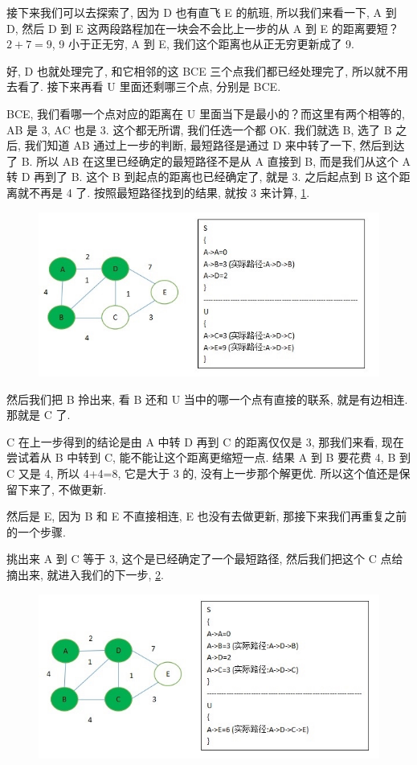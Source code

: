 接下来我们可以去探索了, 因为 D 也有直飞 E 的航班, 所以我们来看一下, A 到 D, 然后 D 到 E 这两段路程加在一块会不会比上一步的从 A 到 E 的距离要短？$2+7=9$, 9 小于正无穷, A 到 E, 我们这个距离也从正无穷更新成了 9.

好, D 也就处理完了, 和它相邻的这 BCE 三个点我们都已经处理完了, 所以就不用去看了. 接下来再看 U 里面还剩哪三个点, 分别是 BCE. 

BCE, 我们看哪一个点对应的距离在 U 里面当下是最小的？而这里有两个相等的, AB 是 3, AC 也是 3. 这个都无所谓, 我们任选一个都 OK. 我们就选 B, 选了 B 之后, 我们知道 AB 通过上一步的判断, 最短路径是通过 D 来中转了一下, 然后到达了 B. 所以 AB 在这里已经确定的最短路径不是从 A 直接到 B, 而是我们从这个 A 转 D 再到了 B. 这个 B 到起点的距离也已经确定了, 就是 3. 之后起点到 B 这个距离就不再是 4 了. 按照最短路径找到的结果, 就按 3 来计算, \ref{fig:img26_5}. 

\begin{figure}[ht]
  \centering
  \includegraphics[width=0.7\linewidth]{asset/20230924051224.jpg}
  \caption{}
  \label{fig:img26_5}
\end{figure}

然后我们把 B 拎出来, 看 B 还和 U 当中的哪一个点有直接的联系, 就是有边相连. 那就是 C 了. 

C 在上一步得到的结论是由 A 中转 D 再到 C 的距离仅仅是 3, 那我们来看, 现在尝试着从 B 中转到 C, 能不能让这个距离更缩短一点. 结果 A 到 B 要花费 4, B 到 C 又是 4, 所以 4+4=8, 它是大于 3 的, 没有上一步那个解更优. 所以这个值还是保留下来了, 不做更新. 

然后是 E, 因为 B 和 E 不直接相连, E 也没有去做更新, 那接下来我们再重复之前的一个步骤. 

挑出来 A 到 C 等于 3, 这个是已经确定了一个最短路径, 然后我们把这个 C 点给摘出来, 就进入我们的下一步, \ref{fig:img26_6}. 

\begin{figure}[ht]
  \centering
  \includegraphics[width=0.7\linewidth]{asset/20230924051225.jpg}
  \caption{}
  \label{fig:img26_6}
\end{figure}


